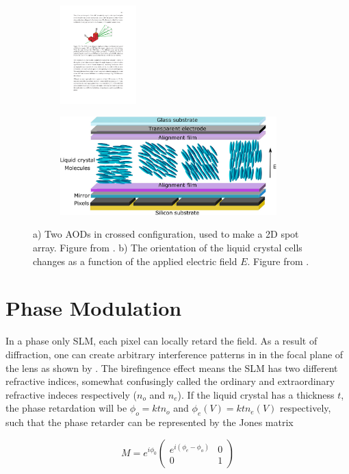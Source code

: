 \begin{figure}
\centering
	\begin{subfigure}{.4\textwidth}
		\centering
		\includegraphics[height=3.8cm]{figures/crossAOD.pdf}
		\caption{}
		\label{fig:CrossAOD}
	\end{subfigure}
	\begin{subfigure}{.5\textwidth}
		\centering
		\includegraphics[height=3.8cm]{figures/LCoS.png}
		\caption{}
		\label{fig:LCoS}
	\end{subfigure}
	\caption{a) Two AODs in crossed configuration, used to make a 2D spot array. Figure from \cite{Madjarov2021}. b) The orientation of the liquid crystal cells changes as a function of the applied electric field $E$. Figure from \cite{Guzman2017}.}
	\label{fig:GerschbergSaxton}
\end{figure}


\section{Phase Modulation}

In a phase only \ac{SLM}, each pixel can locally retard the field. As a result of diffraction, one can create arbitrary interference patterns in in the focal plane of the lens as shown by \cite{Bijnen2013}. The birefingence effect means the \ac{SLM} has two different refractive indices, somewhat confusingly called the ordinary and extraordinary refractive indeces respectively ($n_o$ and $n_e$). If the liquid crystal has a thickness $t$, the phase retardation will be $\phi_o = k t n_o$ and $\phi_e(V) = k t n_e(V)$ respectively, such that the phase retarder can be represented by the Jones matrix \cite{Guzman2017}

\begin{equation}\label{eq:JonesMatrix}
    M = e^{i \phi_0} 
    \begin{pmatrix}
        e^{i(\phi_e-\phi_o)} & 0\\
        0 & 1
    \end{pmatrix}
\end{equation}

